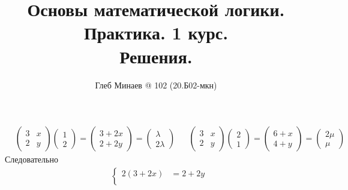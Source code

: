 \documentclass[12pt,a4paper]{article}
\title{Основы математической логики.\\ Практика. 1 курс.\\Решения.}
\author{Глеб Минаев @ 102 (20.Б02-мкн)}
\begin{document}
    \maketitle

    \begin{multicols}{2}
        \tableofcontents
    \end{multicols}

    \begin{enumproblem}
        \begin{align*}
            &\begin{pmatrix}
                3& x\\
                2& y
            \end{pmatrix}
            \begin{pmatrix}
                1\\
                2
            \end{pmatrix}
            =
            \begin{pmatrix}
                3 + 2x\\
                2 + 2y
            \end{pmatrix}
            =
            \begin{pmatrix}
                \lambda\\
                2\lambda
            \end{pmatrix}&
            &\begin{pmatrix}
                3& x\\
                2& y
            \end{pmatrix}
            \begin{pmatrix}
                2\\
                1
            \end{pmatrix}
            =
            \begin{pmatrix}
                6 + x\\
                4 + y
            \end{pmatrix}
            =
            \begin{pmatrix}
                2\mu\\
                \mu
            \end{pmatrix}&
        \end{align*}
        Следовательно
        \begin{align*}
            &\left\{
                \begin{aligned}
                    2(3 + 2x) &= 2 + 2y\\

\end{aligned}
\end{align*}
\end{enumproblem}
\end{document}
